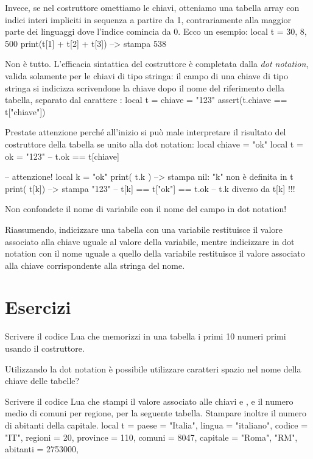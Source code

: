 Invece, se nel costruttore omettiamo le chiavi, otteniamo una tabella array con
indici interi impliciti in sequenza a partire da 1, contrariamente alla maggior
parte dei linguaggi dove l'indice comincia da 0. Ecco un esempio:
\lines
local t = { 30, 8, 500 }
print(t[1] + t[2] + t[3]) --> stampa 538
\endlines
{}

Non è tutto. L'efficacia sintattica del costruttore è completata dalla
\emph{dot notation}, valida solamente per le chiavi di tipo stringa: il campo di
una chiave di tipo stringa si indicizza scrivendone la chiave dopo il nome del
riferimento della tabella, separato dal carattere :
\lines
local t = { chiave = "123" }
assert(t.chiave == t["chiave"])
\endlines
{}

Prestate attenzione perché all'inizio si può male interpretare il risultato del
costruttore della tabella se unito alla dot notation:
\lines
local chiave = "ok"
local t = { ok = "123"} -- t.ok == t[chiave]

-- attenzione!
local k = "ok"
print( t.k ) --> stampa nil: "k" non è definita in t
print( t[k]) --> stampa "123"
-- t[k] == t["ok"] == t.ok
-- t.k diverso da t[k] !!!
\endlines
{}

Non confondete il nome di variabile con il nome del campo in dot notation!

Riassumendo, indicizzare una tabella con una variabile restituisce il valore
associato alla chiave uguale al valore della variabile, mentre indicizzare in
dot notation con il nome uguale a quello della variabile restituisce il valore
associato alla chiave corrispondente alla stringa del nome.


\section{Esercizi}

\begin{Exercise}[label={tab-01}]
Scrivere il codice Lua che memorizzi in una tabella i primi 10 numeri primi
usando il costruttore.
\end{Exercise}

\begin{Exercise}[label={tab-02}]
Utilizzando la dot notation è possibile utilizzare caratteri spazio nel nome
della chiave delle tabelle?
\end{Exercise}

\begin{Exercise}[label={tab-03}]
Scrivere il codice Lua che stampi il valore associato alle chiavi  e
, e il numero medio di comuni per regione, per la seguente tabella.
Stampare inoltre il numero di abitanti della capitale.
\lines
local t = {
    paese = "Italia",
    lingua = "italiano",
    codice = "IT",
    regioni = 20,
    province = 110,
    comuni = 8047,
    capitale = {"Roma", "RM", abitanti = 2753000},
}
\endlines
{}
\end{Exercise}


